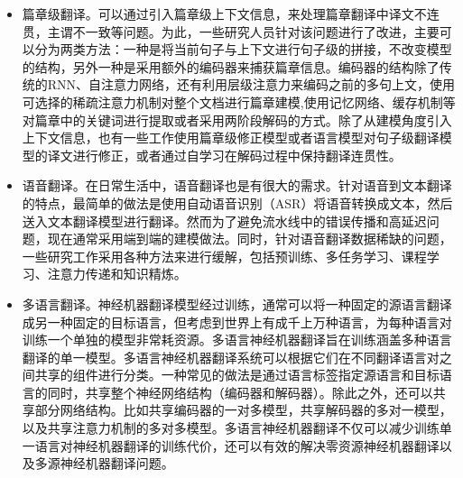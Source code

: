 \begin{itemize}
\vspace{0.5em}
\item 篇章级翻译。可以通过引入篇章级上下文信息，来处理篇章翻译中译文不连贯，主谓不一致等问题。为此，一些研究人员针对该问题进行了改进，主要可以分为两类方法：一种是将当前句子与上下文进行句子级的拼接，不改变模型的结构\cite{DBLP:conf/discomt/TiedemannS17}，另外一种是采用额外的编码器来捕获篇章信息\cite{DBLP:journals/corr/JeanLFC17,DBLP:journals/corr/abs-1805-10163,DBLP:conf/emnlp/ZhangLSZXZL18}。编码器的结构除了传统的RNN、自注意力网络，还有利用层级注意力来编码之前的多句上文\cite{Werlen2018DocumentLevelNM,tan-etal-2019-hierarchical}，使用可选择的稀疏注意力机制对整个文档进行篇章建模\cite{DBLP:conf/naacl/MarufMH19},使用记忆网络、缓存机制等对篇章中的关键词进行提取\cite{DBLP:conf/coling/KuangXLZ18,DBLP:journals/tacl/TuLSZ18}或者采用两阶段解码的方式\cite{DBLP:conf/aaai/XiongH0W19,DBLP:conf/acl/VoitaST19}。除了从建模角度引入上下文信息，也有一些工作使用篇章级修正模型\cite{DBLP:conf/emnlp/VoitaST19}或者语言模型\cite{DBLP:journals/corr/abs-1910-00553}对句子级翻译模型的译文进行修正，或者通过自学习在解码过程中保持翻译连贯性\cite{DBLP:journals/corr/abs-2003-05259}。
\vspace{0.5em}
\item 语音翻译。在日常生活中，语音翻译也是有很大的需求。针对语音到文本翻译的特点，最简单的做法是使用自动语音识别（ASR）将语音转换成文本，然后送入文本翻译模型进行翻译\cite{DBLP:conf/icassp/Ney99,DBLP:conf/interspeech/MatusovKN05}。然而为了避免流水线中的错误传播和高延迟问题，现在通常采用端到端的建模做法\cite{DBLP:conf/naacl/DuongACBC16,DBLP:journals/corr/BerardPSB16}。同时，针对语音翻译数据稀缺的问题，一些研究工作采用各种方法来进行缓解，包括预训练\cite{DBLP:conf/naacl/BansalKLLG19}、多任务学习\cite{Weiss2017SequencetoSequenceMC,DBLP:conf/icassp/BerardBKP18}、课程学习\cite{DBLP:conf/interspeech/KanoS017}、注意力传递\cite{DBLP:journals/tacl/SperberNNW19}和知识精炼\cite{DBLP:conf/interspeech/LiuXZHWWZ19,DBLP:conf/icassp/JiaJMWCCALW19}。
\vspace{0.5em}
\item 多语言翻译。神经机器翻译模型经过训练，通常可以将一种固定的源语言翻译成另一种固定的目标语言，但考虑到世界上有成千上万种语言，为每种语言对训练一个单独的模型非常耗资源\cite{DBLP:journals/tacl/JohnsonSLKWCTVW17}。多语言神经机器翻译旨在训练涵盖多种语言翻译的单一模型。多语言神经机器翻译系统可以根据它们在不同翻译语言对之间共享的组件进行分类。一种常见的做法是通过语言标签指定源语言和目标语言的同时，共享整个神经网络结构（编码器和解码器）\cite{DBLP:journals/corr/HaNW16,DBLP:journals/tacl/JohnsonSLKWCTVW17}。除此之外，还可以共享部分网络结构。比如共享编码器的一对多模型\cite{dong-etal-2015-multi}，共享解码器的多对一模型\cite{firat-etal-2016-zero,Zoph2016MultiSourceNT}，以及共享注意力机制的多对多模型\cite{DBLP:journals/corr/LuongLSVK15,DBLP:conf/naacl/FiratCB16}。多语言神经机器翻译不仅可以减少训练单一语言对神经机器翻译的训练代价，还可以有效的解决零资源神经机器翻译\cite{DBLP:journals/tacl/JohnsonSLKWCTVW17}以及多源神经机器翻译问题\cite{Och01statisticalmulti-source}。

\end{itemize}
